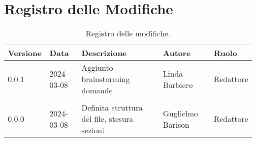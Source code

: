 \section*{Registro delle Modifiche}
\begin{table}[ht!]	
		\centering
		\begin{tabular}{ p{1.2cm} p{2cm} p{6cm} p{3cm} p{2cm}}
			\toprule
			\textbf{Versione}& \textbf{Data} & \textbf{Descrizione} & \textbf{Autore} & \textbf{Ruolo} \\
			\midrule
			0.0.1 & 2024-03-08 & Aggiunto brainstorming domande & Linda Barbiero &
			Redattore \\\\ %
			0.0.0 & 2024-03-08 & Definita struttura del file, stesura sezioni & Guglielmo Barison & Redattore \\
			\bottomrule
		\end{tabular}
		\caption{Registro delle modifiche.}
		\label{table:Registro delle modifiche}
\end{table}

